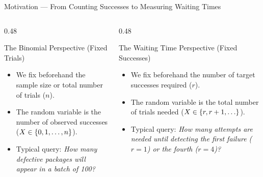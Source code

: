 \documentclass[aspectratio=169,xcolor={dvipsnames,table}]{beamer}
\begin{document}
\begin{frame}{Motivation --- From Counting Successes to Measuring Waiting Times}
	\begin{columns}[T]
		\begin{column}{0.48\textwidth}
			\begin{block}{The Binomial Perspective (Fixed Trials)}
				\small
				\begin{itemize}
					\itemsep=0.06cm
					\item We fix beforehand the sample size or total number of trials ($n$).
					\item The random variable is the number of observed successes ($X \in \left\{ 0, 1, \dots, n \right\}$).
					\item Typical query: \emph{How many defective packages will appear in a batch of 100?}
				\end{itemize}
			\end{block}
		\end{column}
		\begin{column}{0.48\textwidth}
			\begin{alertblock}{The Waiting Time Perspective (Fixed Successes)}
				\small
				\begin{itemize}
					\itemsep=0.06cm
					\item We fix beforehand the number of target successes required ($r$).
					\item The random variable is the total number of trials needed ($X \in \set{r, r+1, \dots}$).
					\item Typical query: \emph{How many attempts are needed until detecting the first failure ($r=1$) or the fourth ($r=4$)?}
				\end{itemize}
			\end{alertblock}
		\end{column}
	\end{columns}
\end{frame}
\end{document}
